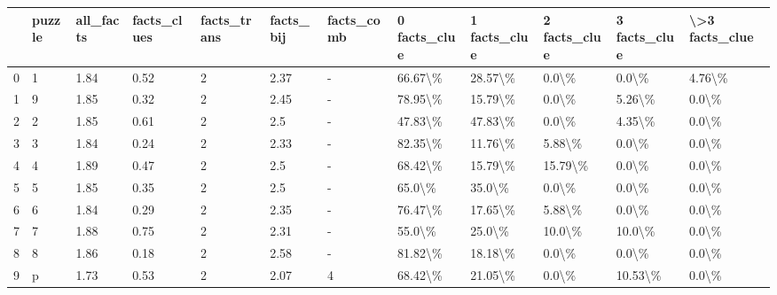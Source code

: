 \begin{tabular}{llllllllllll}
\toprule
{} & puzzle & all\_facts & facts\_clues & facts\_trans & facts\_bij & facts\_comb & 0 facts\_clue & 1 facts\_clue & 2 facts\_clue & 3 facts\_clue & \textbackslash >3 facts\_clue \\
\midrule
0 &      1 &      1.84 &        0.52 &           2 &      2.37 &          - &      66.67\textbackslash \% &      28.57\textbackslash \% &        0.0\textbackslash \% &        0.0\textbackslash \% &         4.76\textbackslash \% \\
1 &      9 &      1.85 &        0.32 &           2 &      2.45 &          - &      78.95\textbackslash \% &      15.79\textbackslash \% &        0.0\textbackslash \% &       5.26\textbackslash \% &          0.0\textbackslash \% \\
2 &      2 &      1.85 &        0.61 &           2 &       2.5 &          - &      47.83\textbackslash \% &      47.83\textbackslash \% &        0.0\textbackslash \% &       4.35\textbackslash \% &          0.0\textbackslash \% \\
3 &      3 &      1.84 &        0.24 &           2 &      2.33 &          - &      82.35\textbackslash \% &      11.76\textbackslash \% &       5.88\textbackslash \% &        0.0\textbackslash \% &          0.0\textbackslash \% \\
4 &      4 &      1.89 &        0.47 &           2 &       2.5 &          - &      68.42\textbackslash \% &      15.79\textbackslash \% &      15.79\textbackslash \% &        0.0\textbackslash \% &          0.0\textbackslash \% \\
5 &      5 &      1.85 &        0.35 &           2 &       2.5 &          - &       65.0\textbackslash \% &       35.0\textbackslash \% &        0.0\textbackslash \% &        0.0\textbackslash \% &          0.0\textbackslash \% \\
6 &      6 &      1.84 &        0.29 &           2 &      2.35 &          - &      76.47\textbackslash \% &      17.65\textbackslash \% &       5.88\textbackslash \% &        0.0\textbackslash \% &          0.0\textbackslash \% \\
7 &      7 &      1.88 &        0.75 &           2 &      2.31 &          - &       55.0\textbackslash \% &       25.0\textbackslash \% &       10.0\textbackslash \% &       10.0\textbackslash \% &          0.0\textbackslash \% \\
8 &      8 &      1.86 &        0.18 &           2 &      2.58 &          - &      81.82\textbackslash \% &      18.18\textbackslash \% &        0.0\textbackslash \% &        0.0\textbackslash \% &          0.0\textbackslash \% \\
9 &      p &      1.73 &        0.53 &           2 &      2.07 &          4 &      68.42\textbackslash \% &      21.05\textbackslash \% &        0.0\textbackslash \% &      10.53\textbackslash \% &          0.0\textbackslash \% \\
\bottomrule
\end{tabular}
